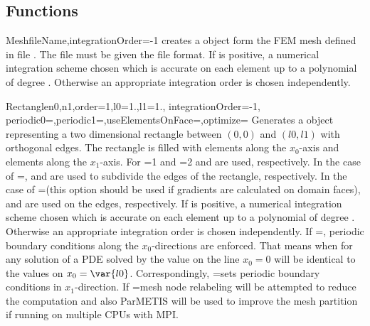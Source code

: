 \subsection{Functions}
\begin{funcdesc}{Mesh}{fileName,integrationOrder=-1}
creates a \Domain object form the FEM mesh defined in 
file . The file must be given the \finley file format.
If  is positive, a numerical integration scheme
chosen which is accurate on each element up to a polynomial of
degree  . Otherwise
an appropriate integration order is chosen independently.
\end{funcdesc}

\begin{funcdesc}{Rectangle}{n0,n1,order=1,l0=1.,l1=1., integrationOrder=-1, \\
  periodic0=\False,periodic1=\False,useElementsOnFace=\False,optimize=\False}
Generates a \Domain object representing a two dimensional rectangle between
$(0,0)$ and $(l0,l1)$ with orthogonal edges. The rectangle is filled with
 elements along the $x_0$-axis and
 elements along the $x_1$-axis. 
For =1 and =2
 and  
 are used, respectively. 
In the case of =\False,
 and  
 are used to subdivide the edges of the rectangle, respectively. 
In the case of =\True (this option should be used if gradients
are calculated on domain faces),
 and  
 are used on the edges, respectively.  
If  is positive, a numerical integration scheme
chosen which is accurate on each element up to a polynomial of
degree  . Otherwise
an appropriate integration order is chosen independently. If
=\True, periodic boundary conditions 
along the $x_0$-directions are enforced. That means when for any solution of a PDE solved by \finley
the value on the line $x_0=0$ will be identical to the values on $x_0=\var{l0}$.
Correspondingly,
=\False sets periodic boundary conditions
in $x_1$-direction.
If =\True mesh node relabeling will be attempted to reduce the computation and also ParMETIS will be used to improve the mesh partition if running on multiple CPUs with MPI.
\end{funcdesc}

